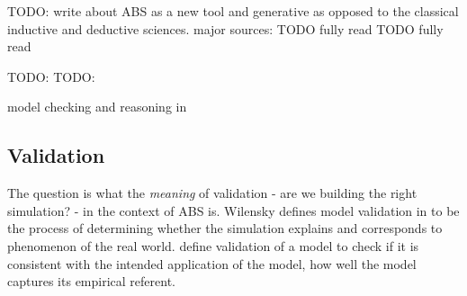 TODO: write about ABS as a new tool and  generative as opposed to the classical inductive and deductive sciences. major sources: 
TODO fully read \cite{epstein_chapter_2006}
TODO fully read \cite{epstein_generative_2012}

TODO: \cite{galan_errors_2009}
TODO: \cite{windrum_empirical_2007}

model checking and reasoning in \cite{hutton_tutorial_1999}\\

\subsection{Validation}
The question is what the \textit{meaning} of validation - are we building the right simulation? - in the context of ABS is. Wilensky defines model validation in \cite{wilensky_making_2007} to be the process of determining whether the simulation explains and corresponds to phenomenon of the real world.
\cite{galan_errors_2009} define validation of a model to check if it is consistent with the intended application of the model, how well the model captures its empirical referent.